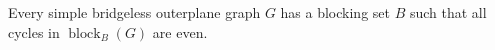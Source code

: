 \documentclass{cccg16}
\DeclareMathOperator{\block}{block}
\begin{document}
%
%


\begin{lem}
  Every simple bridgeless outerplane graph $G$ has a blocking set $B$
  such that all cycles in $\block_B(G)$ are even.
\end{lem}
\end{document}
